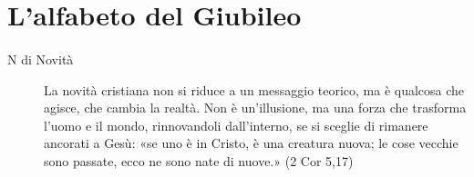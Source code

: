 \section{L'alfabeto del Giubileo}

\paragraph{}
\vspace*{-\parskip}

\begin{description}

  \item[N di Novità] La novità cristiana non si riduce a un messaggio teorico, ma è qualcosa che agisce, che cambia la realtà. Non è un’illusione, ma una forza che trasforma l’uomo e il mondo, rinnovandoli dall’interno, se si sceglie di rimanere ancorati a Gesù: «se uno è in Cristo, è una creatura nuova; le cose vecchie sono passate, ecco ne sono nate di nuove.» (2 Cor 5,17)
\end{description}


